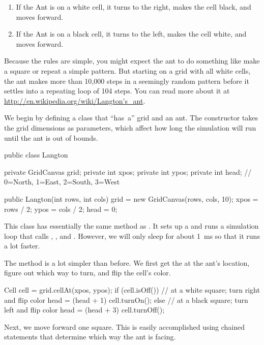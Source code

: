 \begin{enumerate}
\item If the Ant is on a white cell, it turns to the right, makes the cell black, and moves forward.
\item If the Ant is on a black cell, it turns to the left, makes the cell white, and moves forward.
\end{enumerate}

Because the rules are simple, you might expect the ant to do something like make a square or repeat a simple pattern.
But starting on a grid with all white cells, the ant makes more than 10,000 steps in a seemingly random pattern before it settles into a repeating loop of 104 steps.
You can read more about it at \url{http://en.wikipedia.org/wiki/Langton's_ant}.

We begin by defining a  class that ``has~a'' grid and an ant.
The constructor takes the grid dimensions as parameters, which affect how long the simulation will run until the ant is out of bounds.

\begin{code}
public class Langton {
    private GridCanvas grid;
    private int xpos;
    private int ypos;
    private int head; // 0=North, 1=East, 2=South, 3=West

    public Langton(int rows, int cols) {
        grid = new GridCanvas(rows, cols, 10);
        xpos = rows / 2;
        ypos = cols / 2;
        head = 0;
    }
}
\end{code}

This class has essentially the same  method as .
It sets up a  and runs a simulation loop that calls , , and .
However, we will only sleep for about 1~ms so that it runs a lot faster.

The  method is a lot simpler than before.
We first get the  at the ant's location, figure out which way to turn, and flip the cell's color.

\begin{code}
Cell cell = grid.cellAt(xpos, ypos);
if (cell.isOff()) {
    // at a white square; turn right and flip color
    head = (head + 1) %
    cell.turnOn();
} else {
    // at a black square; turn left and flip color
    head = (head + 3) %
    cell.turnOff();
}
\end{code}

Next, we move forward one square.
This is easily accomplished using chained  statements that determine which way the ant is facing.

